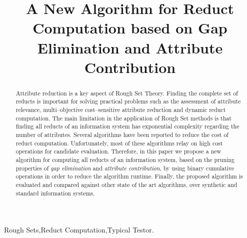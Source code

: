 \documentclass[authoryear,preprint,review,12pt]{elsarticle}
\begin{document}
	
	\title{A New Algorithm for Reduct Computation based on Gap Elimination and Attribute Contribution}
		
	
	\address{Computer Science Department\\
	Instituto Nacional de Astrof\'{\i}sica, \'{O}ptica y Electr\'{o}nica\\
	Luis Enrique Erro \# 1, Santa Mar\'{\i}a Tonantzintla, Puebla,
	72840, M\'{e}xico} 
	
	\begin{abstract}
		Attribute reduction is a key aspect of Rough Set Theory.  Finding the complete set of reducts is important for solving practical problems such as the assessment of attribute relevance, multi--objective 		cost--sensitive attribute reduction and dynamic reduct computation. The main limitation in the application of Rough Set methods is that finding all reducts of an information system has exponential complexity regarding the number of attributes. Several algorithms have been reported to reduce the cost of reduct computation. Unfortunately, most of these algorithms relay on high cost operations for candidate evaluation. Therefore, in this paper we propose a new algorithm for computing all reducts of an information system, based on the pruning properties of \textit{gap  elimination} and \textit{attribute contribution}, by using binary cumulative operations in order to reduce the algorithm runtime. Finally, the proposed algorithm is evaluated and compared against other state of the art algorithms, over synthetic and standard information systems.
	\end{abstract}
	
	\begin{keyword}
		Rough Sets\sep Reduct Computation\sep Typical Testor.
	\end{keyword}

	\maketitle

\end{document}
